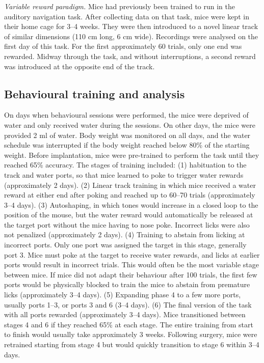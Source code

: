 \textit{Variable reward paradigm.} Mice had previously been trained to run in the auditory navigation task. After collecting data on that task, mice were kept in their home cage for 3--4 weeks. They were then introduced to a novel linear track of similar dimensions (110 cm long, 6 cm wide). Recordings were analysed on the first day of this task. For the first approximately 60 trials, only one end was rewarded. Midway through the task, and without interruptions, a second reward was introduced at the opposite end of the track.

\subsection{Behavioural training and analysis}

On days when behavioural sessions were performed, the mice were deprived of water and only received water during the sessions. On other days, the mice were provided 2 ml of water. Body weight was monitored on all days, and the water schedule was interrupted if the body weight reached below 80\% of the starting weight. Before implantation, mice were pre-trained to perform the task until they reached 65\% accuracy. The stages of training included: (1) habituation to the track and water ports, so that mice learned to poke to trigger water rewards (approximately 2 days). (2) Linear track training in which mice received a water reward at either end after poking and reached up to 60--70 trials (approximately 3--4 days). (3) Autoshaping, in which tones would increase in a closed loop to the position of the mouse, but the water reward would automatically be released at the target port without the mice having to nose poke. Incorrect licks were also not penalized (approximately 2 days). (4) Training to abstain from licking at incorrect ports. Only one port was assigned the target in this stage, generally port 3. Mice must poke at the target to receive water rewards, and licks at earlier ports would result in incorrect trials. This would often be the most variable stage between mice. If mice did not adapt their behaviour after 100 trials, the first few ports would be physically blocked to train the mice to abstain from premature licks (approximately 3--4 days). (5) Expanding phase 4 to a few more ports, usually ports 1--3, or ports 3 and 6 (3--4 days). (6) The final version of the task with all ports rewarded (approximately 3--4 days). Mice transitioned between stages 4 and 6 if they reached 65\% at each stage. The entire training from start to finish would usually take approximately 3 weeks. Following surgery, mice were retrained starting from stage 4 but would quickly transition to stage 6 within 3--4 days.

